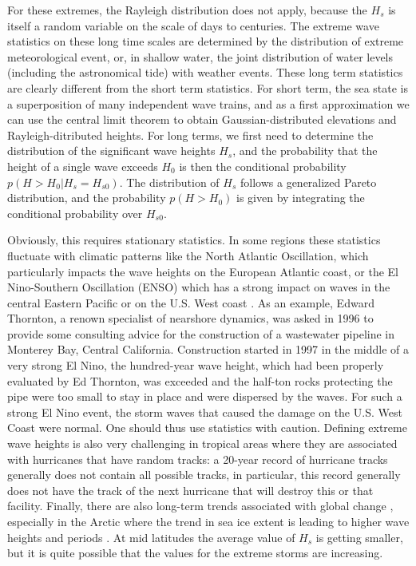 For these extremes, the Rayleigh distribution does not apply, because the $H_s$ is itself a random variable on the 
scale of days to centuries. The extreme wave statistics on these long time scales are determined by the 
distribution of extreme meteorological event, or, in shallow water, the joint distribution of water levels (including 
the astronomical tide) with weather events. These long term statistics are clearly different from the short term statistics. 
For short term, the sea state is a superposition of many independent wave trains, and as a first approximation we can use the central limit theorem to obtain Gaussian-distributed elevations and Rayleigh-ditributed heights. 
For long terms, we first need to determine the distribution of the significant wave heights  $H_{s}$, and the probability 
that the height of a single wave exceeds $H_0$ is then the conditional 
probability $p(H > H_0  | H_s = H_{s0})$. The distribution of $H_s$ follows a generalized Pareto distribution, 
and the probability $p(H > H_0)$ is given by integrating the conditional probability over $H_{s0}$. 

Obviously, this requires stationary statistics. In some regions 
these statistics fluctuate with climatic patterns like the North Atlantic Oscillation, which particularly impacts
the wave heights on the European Atlantic coast, or the El Nino-Southern Oscillation  (ENSO) which has a strong 
impact on waves in the central Eastern Pacific or on the U.S. West coast \citep{Bromirski&al.2005}. 
As an example, Edward Thornton, a renown specialist of nearshore dynamics, was asked in 1996 to provide 
some consulting advice for the construction of a wastewater pipeline in Monterey Bay, Central California. 
Construction started in 1997 in the middle of a very strong El Nino, 
the hundred-year wave height, which had been properly evaluated by Ed Thornton, was exceeded 
and the half-ton rocks protecting the pipe were too small to stay in place and were dispersed by the waves. 
For such a strong El Nino event, the storm waves that caused the damage on the U.S. West Coast were normal. 
One should thus use statistics with caution. Defining extreme wave heights is also very challenging in tropical areas where
they are associated with hurricanes that have random tracks: a 20-year record of hurricane tracks generally does not contain 
all possible tracks, in particular, this record generally does not have the track of the next hurricane that will destroy this or that facility. 
Finally, there are also long-term trends associated with global change \citep[e.g.][]{Wang&Swail2002,Charles&al.2012}, 
especially in the Arctic where the trend in sea ice extent  is leading to higher wave heights and periods \citep{Stopa&al.2016b}. At mid latitudes the average value of $H_s$  is getting smaller, but it is quite possible that the values for the extreme storms are increasing.

